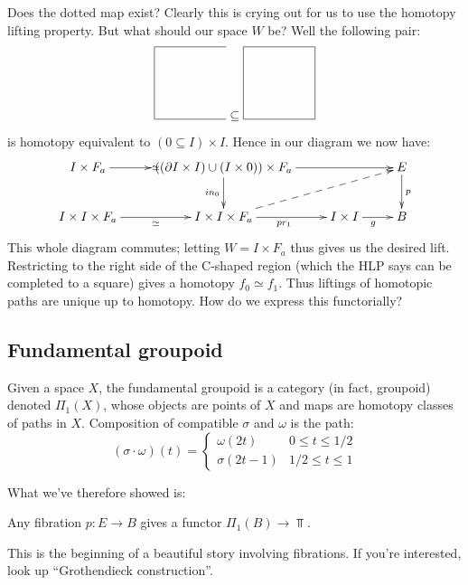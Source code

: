 Does the dotted map exist? Clearly this is crying out for us to use the homotopy lifting property. But what should our space $W$ be? Well the following pair:
\begin{equation*}
    \begin{tikzpicture}
	\draw (2,2) -- (0,2) -- (0,0) -- (2,0);
    \end{tikzpicture}\subseteq
    \begin{tikzpicture}
	\draw (0,0) -- (0,2) -- (2,2) -- (2,0) -- (0,0);
    \end{tikzpicture}
\end{equation*}
is homotopy equivalent to $(0\subseteq I)\times I$. Hence in our diagram we now have:
\begin{equation*}
    \xymatrix{
	I\times F_a\ar[r]|{\simeq} & ((\partial I\times I)\cup (I\times 0))\times F_a\ar[d]_{in_0}\ar[rr] & & E\ar[d]^p\\
	I\times I\times F_a\ar[r]_{\simeq} & I\times I\times F_a\ar[r]_{pr_1}\ar@{-->}[urr] & I\times I\ar[r]_g & B
    }
\end{equation*}
This whole diagram commutes; letting $W=I\times F_a$ thus gives us the desired lift. Restricting to the right side of the C-shaped region (which the HLP says can be completed to a square) gives a homotopy $f_0\simeq f_1$. Thus liftings of homotopic paths are unique up to homotopy. How do we express this functorially?
\subsection{Fundamental groupoid}
\begin{definition}
    Given a space $X$, the fundamental groupoid is a category (in fact, groupoid) denoted $\Pi_1(X)$, whose objects are points of $X$ and maps are homotopy classes of paths in $X$. Composition of compatible $\sigma$ and $\omega$ is the path:
    \begin{equation*}
	(\sigma\cdot\omega)(t) = \begin{cases}
	    \omega(2t) & 0\leq t\leq 1/2\\
	    \sigma(2t - 1) & 1/2\leq t\leq 1
	\end{cases}
    \end{equation*}
\end{definition}
What we've therefore showed is:
\begin{prop}
    Any fibration $p:E\to B$ gives a functor $\Pi_1(B)\to \Top$.
\end{prop}
This is the beginning of a beautiful story involving fibrations. If you're interested, look up ``Grothendieck construction''.
